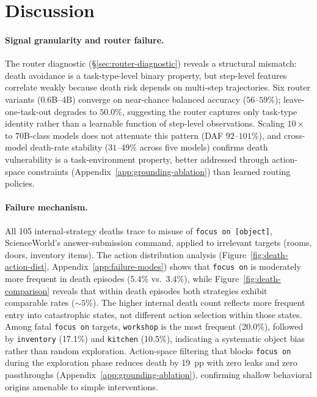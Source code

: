 \section{Discussion}
\label{sec:discussion}

\paragraph{Signal granularity and router failure.}
The router diagnostic (\S\ref{sec:router-diagnostic}) reveals a structural mismatch: death avoidance is a task-type-level binary property, but step-level features correlate weakly because death risk depends on multi-step trajectories. Six router variants (0.6B--4B) converge on near-chance balanced accuracy ($56$--$59\%$); leave-one-task-out degrades to $50.0\%$, suggesting the router captures only task-type identity rather than a learnable function of step-level observations. Scaling $10{\times}$ to 70B-class models does not attenuate this pattern (DAF $92$--$101\%$), and cross-model death-rate stability ($31$--$49\%$ across five models) confirms death vulnerability is a task-environment property, better addressed through action-space constraints (Appendix~\ref{app:grounding-ablation}) than learned routing policies.

\paragraph{Failure mechanism.}
All 105 internal-strategy deaths trace to misuse of \texttt{focus on [object]}, ScienceWorld's answer-submission command, applied to irrelevant targets (rooms, doors, inventory items). The action distribution analysis (Figure~\ref{fig:death-action-dist}, Appendix~\ref{app:failure-modes}) shows that \texttt{focus on} is moderately more frequent in death episodes ($5.4\%$ vs.\ $3.4\%$), while Figure~\ref{fig:death-comparison} reveals that within death episodes both strategies exhibit comparable rates (${\sim}5\%$). The higher internal death count reflects more frequent entry into catastrophic states, not different action selection within those states. Among fatal \texttt{focus on} targets, \texttt{workshop} is the most frequent (20.0\%), followed by \texttt{inventory} (17.1\%) and \texttt{kitchen} (10.5\%), indicating a systematic object bias rather than random exploration. Action-space filtering that blocks \texttt{focus on} during the exploration phase reduces death by 19~pp with zero leaks and zero passthroughs (Appendix~\ref{app:grounding-ablation}), confirming shallow behavioral origins amenable to simple interventions.

